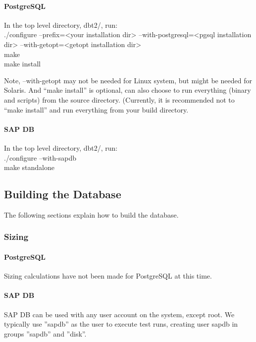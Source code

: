 \documentclass{article}
\begin{document}
\paragraph{PostgreSQL}

In the top level directory, dbt2/, run: \\
\indent ./configure --prefix=<your installation dir> --with-postgresql=<pgsql
installation dir> --with-getopt=<getopt installation dir> \\
\indent make \\
\indent make install

Note, --with-getopt may not be needed for Linux system, but might be needed for
Solaris. And ``make install'' is optional, can also choose to run everything
(binary and scripts) from the source directory. (Currently, it is recommended
not to ``make install'' and run everything from your build directory.

\paragraph{SAP DB}

In the top level directory, dbt2/, run: \\
\indent ./configure --with-sapdb \\
\indent make standalone

\subsection{Building the Database}

The following sections explain how to build the database.

\subsubsection{Sizing}

\paragraph{PostgreSQL}

Sizing calculations have not been made for PostgreSQL at this time.

\paragraph{SAP DB}

SAP DB can be used with any user account on the system, except root.  We
typically use ''sapdb'' as the user to execute test runs, creating user sapdb
in groups ''sapdb'' and ''disk''.
\end{document}
